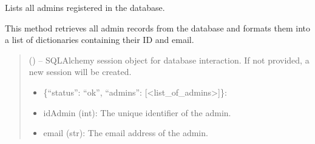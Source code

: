 \documentclass[letterpaper,10pt,english]{sphinxmanual}
\begin{document}
\begin{fulllineitems}
\begin{fulllineitems}
\begin{quote}
\begin{description}
\end{description}\end{quote}

\end{fulllineitems}


\begin{fulllineitems}
\label{\detokenize{app.controllers:app.controllers.admin_controller.AdminController.listAdmins}}
\pysigstartsignatures
\pysiglinewithargsret
{}
{}
{}
\pysigstopsignatures
\sphinxAtStartPar
Lists all admins registered in the database.

\sphinxAtStartPar
This method retrieves all admin records from the database and formats them
into a list of dictionaries containing their ID and email.
\begin{quote}\begin{description}
\sphinxAtStartPar
{} (\sphinxstyleliteralemphasis{\sphinxupquote{, }}) – SQLAlchemy session object for database interaction.
If not provided, a new session will be created.

\sphinxAtStartPar
\begin{description}
\begin{itemize}
\item {} 
\sphinxAtStartPar
\{“status”: “ok”, “admins”: {[}<list\_of\_admins>{]}\}:

\end{itemize}
\begin{description}
\begin{itemize}
\item {} 
\sphinxAtStartPar
idAdmin (int): The unique identifier of the admin.

\item {} 
\sphinxAtStartPar
email (str): The email address of the admin.

\end{itemize}


\end{description}
\end{description}
\end{description}
\end{quote}
\end{fulllineitems}
\end{fulllineitems}
\end{document}
